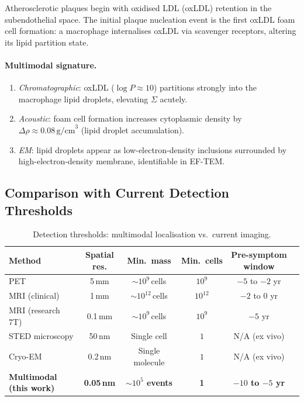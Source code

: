 Atherosclerotic plaques begin with oxidised LDL (oxLDL) retention in the
subendothelial space.  The initial plaque nucleation event is the first
oxLDL foam cell formation: a macrophage internalises oxLDL via scavenger
receptors, altering its lipid partition state.

\paragraph{Multimodal signature.}
\begin{enumerate}[label=(\arabic*),leftmargin=2em]
  \item \emph{Chromatographic}: oxLDL ($\log P \approx 10$) partitions
    strongly into the macrophage lipid droplets, elevating $\Sigma$ acutely.
  \item \emph{Acoustic}: foam cell formation increases cytoplasmic density
    by $\Delta\rho \approx 0.08\,\text{g/cm}^3$ (lipid droplet accumulation).
  \item \emph{EM}: lipid droplets appear as low-electron-density inclusions
    surrounded by high-electron-density membrane, identifiable in EF-TEM.
\end{enumerate}

\subsection{Comparison with Current Detection Thresholds}
\label{sec:ch06-comparison-thresholds}

\begin{table}[ht]
\centering
\caption{Detection thresholds: multimodal localisation vs.\ current imaging.}
\label{tab:ch06-detection-thresholds}
\begin{tabular}{lccccc}
\toprule
Method & Spatial res. & Min.\ mass & Min.\ cells & Pre-symptom window \\
\midrule
PET & 5\,mm & $\sim\!10^{9}$\,cells & $10^9$ & $-5$ to $-2$ yr \\
MRI (clinical) & 1\,mm & $\sim\!10^{12}$\,cells & $10^{12}$ & $-2$ to $0$ yr \\
MRI (research 7T) & 0.1\,mm & $\sim\!10^{9}$\,cells & $10^9$ & $-5$ yr \\
STED microscopy & 50\,nm & Single cell & $1$ & N/A (ex vivo) \\
Cryo-EM & 0.2\,nm & Single molecule & $1$ & N/A (ex vivo) \\
\textbf{Multimodal (this work)} & \textbf{0.05\,nm} & \textbf{$\sim\!10^5$ events} & \textbf{1} & \textbf{$-10$ to $-5$ yr} \\
\bottomrule
\end{tabular}
\end{table}

